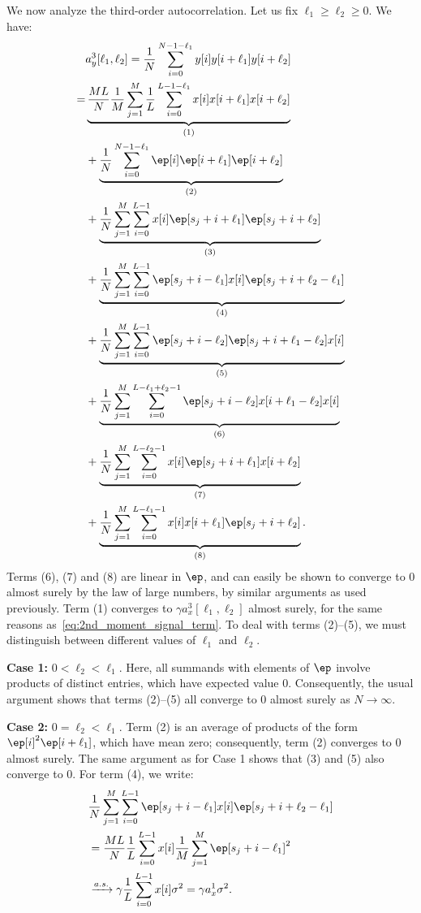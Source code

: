 \documentclass[9pt,twocolumn,twoside,lineno]{pnas-new}
\begin{document}
We now analyze the third-order autocorrelation. Let us fix $\ell_1\geq\ell_2\ge0$. We have:
%
\begin{align*}
%
&a_y^3[\ell_1,\ell_2] 
= \frac{1}{N}\sum_{i=0}^{N-1-\ell_1} y[i]y[i+\ell_1]y[i+\ell_2]
\nonumber \\
%
=& \underbrace{ \frac{ML}{N}\frac{1}{M}\sum_{j=1}^M 
	\frac{1}{L}\sum_{i=0}^{L-1-\ell_1}x[i]x[i+\ell_1]x[i+\ell_2]   }_{(1)}
\\& + \underbrace{\frac{1}{N}\sum_{i=0}^{N-1-\ell_1} \ep[i]\ep[i+\ell_1]\ep[i+\ell_2]}_{(2)}
\nonumber \\
&+ \underbrace{\frac{1}{N}\sum_{j=1}^{M} 
	\sum_{i=0}^{L-1} x[i]\ep[s_j + i+\ell_1]\ep[s_j+ i+\ell_2]}_{(3)}
\\& + \underbrace{\frac{1}{N}\sum_{j=1}^{M} 
	\sum_{i=0}^{L-1} \ep[s_j+i-\ell_1]x[i]\ep[s_j+ i+\ell_2-\ell_1]}_{(4)}
\nonumber \\
&+ \underbrace{\frac{1}{N}\sum_{j=1}^{M} 
	\sum_{i=0}^{L-1} \ep[s_j+i-\ell_2]\ep[s_j+i+\ell_1-\ell_2]x[i]}_{(5)}
\\ & + \underbrace{\frac{1}{N}\sum_{j=1}^{M} 
	\sum_{i=0}^{L-\ell_1+\ell_2-1} \ep[s_j+i-\ell_2]x[i+\ell_1-\ell_2]x[i]}_{(6)}
\nonumber \\
&+ \underbrace{\frac{1}{N}\sum_{j=1}^{M} 
	\sum_{i=0}^{L-\ell_2-1} x[i]\ep[s_j + i+\ell_1]x[i+\ell_2]}_{(7)}
\\ & + \underbrace{\frac{1}{N}\sum_{j=1}^{M} 
	\sum_{i=0}^{L-\ell_1-1} x[i]x[i+\ell_1]\ep[s_j+ i+\ell_2]}_{(8)}.
%
\end{align*}
%
Terms (6), (7) and (8) are linear in $\ep$, and can easily be shown to converge to 0 almost surely by the law of large numbers, by similar arguments as used previously. Term (1) converges to $\gamma a_x^3[\ell_1,\ell_2]$ almost surely, for the same reasons as~\eqref{eq:2nd_moment_signal_term}. To deal with terms (2)--(5), we must distinguish between different values of $\ell_1$ and $\ell_2$.

{\bf Case 1:} $0 < \ell_2 < \ell_1$. Here, all summands with elements of $\ep$ involve products of distinct entries, which have expected value 0. Consequently, the usual argument shows that terms (2)--(5) all converge to 0 almost surely as $N \to \infty$.

{\bf Case 2:} $0=\ell_2 < \ell_1$. Term (2) is an average of products of the form $\ep[i]^2\ep[i+\ell_1]$, which have mean zero; consequently, term (2) converges to 0 almost surely. The same argument as for Case 1 shows that (3) and (5) also converge to 0. For term (4), we write:
%
\begin{align*}
%
&\frac{1}{N}\sum_{j=1}^{M} 
\sum_{i=0}^{L-1} \ep[s_j+i-\ell_1]x[i]\ep[s_j+ i+\ell_2-\ell_1]
\nonumber \\
&= \frac{ML}{N}\frac{1}{L}\sum_{i=0}^{L-1}x[i] \frac{1}{M}\sum_{j=1}^{M} \ep[s_j+i-\ell_1]^2
\\& \xrightarrow{a.s.} \gamma \frac{1}{L} \sum_{i=0}^{L-1}x[i] \sigma^2 = \gamma a_x^1 \sigma^2. \nonumber
%
\end{align*}
\end{document}

